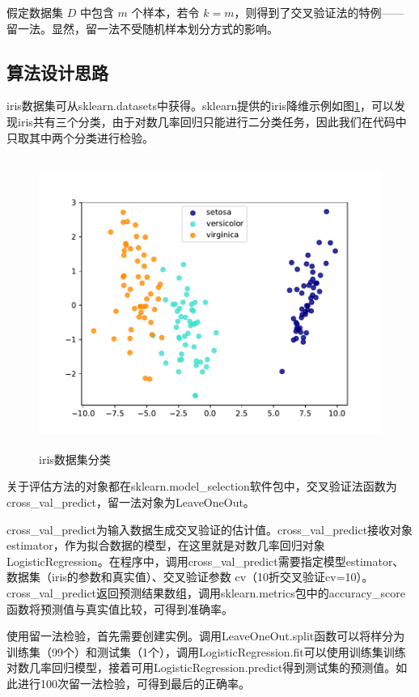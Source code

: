\documentclass{ctexart}
\begin{document}
	假定数据集 $D$ 中包含 $m$ 个样本，若令 $k=m$，则得到了交叉验证法的特例——留一法。显然，留一法不受随机样本划分方式的影响。
	
	\subsection{算法设计思路}
	
	iris数据集可从sklearn.datasets中获得。sklearn提供的iris降维示例如图\ref{iris数据集分类}，可以发现iris共有三个分类，由于对数几率回归只能进行二分类任务，因此我们在代码中只取其中两个分类进行检验。
	
	\begin{figure}[htb]
		\centering
		\includegraphics[scale=1,height=9.5cm]{../image/iris分类.pdf}
		\caption{iris数据集分类}
		\label{iris数据集分类}
	\end{figure}

	关于评估方法的对象都在sklearn.model\_selection软件包中，交叉验证法函数为cross\_val\_predict，留一法对象为LeaveOneOut。
	
	cross\_val\_predict为输入数据生成交叉验证的估计值。cross\_val\_predict接收对象estimator，作为拟合数据的模型，在这里就是对数几率回归对象LogisticRegression。在程序中，调用cross\_val\_predict需要指定模型estimator、数据集（iris的参数和真实值）、交叉验证参数 cv（10折交叉验证cv=10）。cross\_val\_predict返回预测结果数组，调用sklearn.metrics包中的accuracy\_score函数将预测值与真实值比较，可得到准确率。
	
	使用留一法检验，首先需要创建实例。调用LeaveOneOut.split函数可以将样分为训练集（99个）和测试集（1个），调用LogisticRegression.fit可以使用训练集训练对数几率回归模型，接着可用LogisticRegression.predict得到测试集的预测值。如此进行100次留一法检验，可得到最后的正确率。
	
\end{document}
